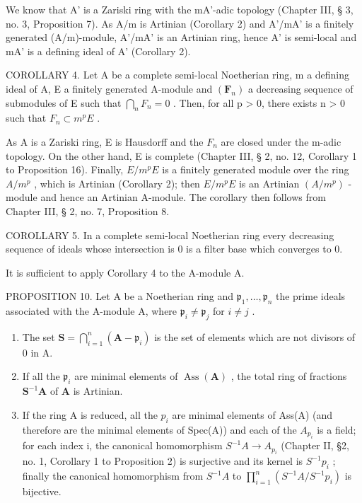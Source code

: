 We know that A' is a Zariski ring with the mA'-adic topology (Chapter III, § 3, no. 3, Proposition 7). As A/m is Artinian (Corollary 2) and A'/mA' is a finitely generated (A/m)-module, A'/mA' is an Artinian ring, hence A' is semi-local and mA' is a defining ideal of A' (Corollary 2).

COROLLARY 4. Let A be a complete semi-local Noetherian ring, m a defining ideal of A, E a finitely generated A-module and \((\mathbf{F}_{n})\) a decreasing sequence of submodules of E such that \(\bigcap_{n} F_{n} = 0\) . Then, for all p \textgreater{} 0, there exists n \textgreater{} 0 such that \(F_{n} \subset m^{p}E\) .

As A is a Zariski ring, E is Hausdorff and the \(F_{n}\) are closed under the m-adic topology. On the other hand, E is complete (Chapter III, § 2, no. 12, Corollary 1 to Proposition 16). Finally, \(E/m^{p}E\) is a finitely generated module over the ring \(A/m^{p}\) , which is Artinian (Corollary 2); then \(E/m^{p}E\) is an Artinian \((A/m^{p})\) -module and hence an Artinian A-module. The corollary then follows from Chapter III, § 2, no. 7, Proposition 8.

COROLLARY 5. In a complete semi-local Noetherian ring every decreasing sequence of ideals whose intersection is 0 is a filter base which converges to 0.

It is sufficient to apply Corollary 4 to the A-module A.

PROPOSITION 10. Let A be a Noetherian ring and \(\mathfrak{p}_1, \ldots, \mathfrak{p}_n\) the prime ideals associated with the A-module A, where \(\mathfrak{p}_i \neq \mathfrak{p}_j\) for \(i \neq j\) .

\begin{enumerate}
\def\labelenumi{(\roman{enumi})}
\item
  The set \(\mathbf{S} = \bigcap_{i=1}^{n} (\mathbf{A} - \mathfrak{p}_i)\) is the set of elements which are not divisors of 0 in A.\\
\item
  If all the \(\mathfrak{p}_i\) are minimal elements of \(\operatorname{Ass}(\mathbf{A})\) , the total ring of fractions \(\mathbf{S}^{-1}\mathbf{A}\) of \(\mathbf{A}\) is Artinian.
\item
  If the ring A is reduced, all the \(p_{i}\) are minimal elements of Ass(A) (and therefore are the minimal elements of Spec(A)) and each of the \(A_{p_{i}}\) is a field; for each index i, the canonical homomorphism \(S^{-1}A \to A_{p_{i}}\) (Chapter II, §2, no. 1, Corollary 1 to Proposition 2) is surjective and its kernel is \(S^{-1}p_{i}\) ; finally the canonical homomorphism from \(S^{-1}A\) to \(\prod_{i=1}^{n} (S^{-1}A/S^{-1}p_{i})\) is bijective.
\end{enumerate}

